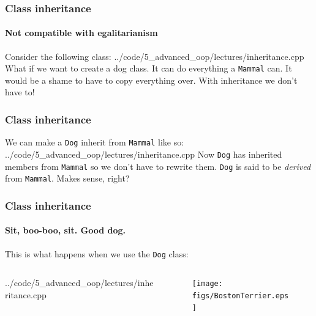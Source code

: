 \documentclass{beamer}
\begin{document}
\begin{frame}
  \frametitle{Class inheritance}
  \framesubtitle{Not compatible with egalitarianism}

	Consider the following class:
    {../code/5_advanced_oop/lectures/inheritance.cpp}
    \pause
  What if we want to create a dog class.  It can do everything a \texttt{Mammal} can.  It would be a shame to have to copy everything over.  With inheritance we don't have to!
\end{frame}

\begin{frame}
  \frametitle{Class inheritance}

  We can make a \texttt{Dog} inherit from \texttt{Mammal} like so:
    {../code/5_advanced_oop/lectures/inheritance.cpp}
  \pause
  Now \texttt{Dog} has inherited members from \texttt{Mammal} so we don't have to rewrite them.  \texttt{Dog} is said to be \textit{derived} from \texttt{Mammal}. Makes sense, right?
\end{frame}

\begin{frame}[fragile]
  \frametitle{Class inheritance}
  \framesubtitle{Sit, boo-boo, sit.  Good dog.}
  
  This is what happens when we use the \texttt{Dog} class:
  \begin{columns}[t]
    \begin{column}[T]{0.5\linewidth}
    		{../code/5_advanced_oop/lectures/inheritance.cpp}
    \end{column}
    \pause
  	\begin{column}[T]{0.48\linewidth}
			  \begin{figure}
			    \centering
					\texttt{[image: figs/BostonTerrier.eps]}
				\end{figure}
  	\end{column}
  \end{columns}

\end{frame}
\end{document}
